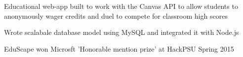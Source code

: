\documentclass[]{deedy-resume-openfont}
\begin{document}
\begin{minipage}[t]{0.66\textwidth}
\begin{tightemize}
\item Educational web-app built to work with the Canvas API to allow students to anonymously wager credits and duel to compete for classroom high scores
\item Wrote scalabale database model using MySQL and integrated it with Node.js 
\item EduScape won Microsft 'Honorable mention prize' at HackPSU Spring 2015
\end{tightemize}
\sectionsep

\end{minipage} 
\end{document}
